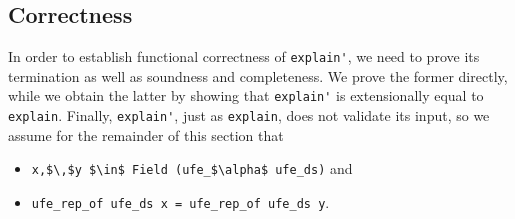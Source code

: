 \documentclass[
  sigplan,
  10pt,
  anonymous,
  review,
  ]{acmart}
\begin{document}
\subsection{Correctness}
In order to establish functional correctness of \lstinline|explain'|, we need to prove its termination as well as soundness and completeness.
We prove the former directly, while we obtain the latter by showing that \lstinline|explain'| is extensionally equal to \lstinline|explain|.
Finally, \lstinline|explain'|, just as \lstinline|explain|, does not validate its input, so we assume for the remainder of this section that
\begin{itemize}
  \item \lstinline|x,$\,$y $\in$ Field (ufe_$\alpha$ ufe_ds)| and
  \item \lstinline|ufe_rep_of ufe_ds x = ufe_rep_of ufe_ds y|.
\end{itemize}
\end{document}
